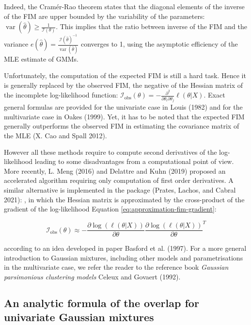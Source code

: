 Indeed, the Cramér-Rao theorem states that the diagonal elements of the
inverse of the FIM are upper bounded by the variability of the
parameters:
\(\operatorname{var}(\hat{\theta}) \ge \frac{1}{\mathcal{I}(\theta)}\). This
implies that the ratio between inverse of the FIM and the variance
\(e(\hat{\theta})=\frac{\mathcal{I}(\hat{\theta})^{-1}}{\operatorname{var}(\hat{\theta})}\)
converges to 1, using the asymptotic efficiency of the MLE estimate of
GMMs.

Unfortunately, the computation of the expected FIM is still a hard task.
Hence it is generally replaced by the observed FIM, the negative of the
Hessian matrix of the incomplete log-likelihood function:
\(\mathcal{I}_\text{obs}(\theta)= -\frac{\partial^2}{\partial \theta_i \partial \theta_j} \ell(\theta|X)\).
Exact general formulas are provided for the univariate case in Louis (1982)
and for the multivariate case in Oakes (1999). Yet, it has to be noted that
the expected FIM generally outperforms the observed FIM in estimating
the covariance matrix of the MLE (X. Cao and Spall 2012).

However all these methods require to compute second derivatives of the
log-likelihood leading to some disadvantages from a computational point
of view. More recently, L. Meng (2016) and Delattre and Kuhn (2019) proposed an
accelerated algorithm requiring only computation of first order
derivatives. A similar alternative is implemented in the
 package (Prates, Lachos, and Cabral 2021):
, in which the Hessian matrix is approximated by the cross-product of the
gradient of the log-likelihood Equation
\eqref{eq:approximation-fim-gradient}:

\begin{equation}
        \mathcal{I}_{\text{obs}}(\theta) \approx - \frac{\partial \log (\ell (\theta|X))}{\partial \theta} \frac{\partial \log (\ell (\theta|X))}{\partial \theta}^T
    \label{eq:approximation-fim-gradient}
\end{equation}

according to an idea developed in paper Basford et al. (1997). For a more general introduction to Gaussian mixtures, including other models and parametrisations in the multivariate case, we refer the reader to the reference book \emph{Gaussian parsimonious clustering models}
Celeux and Govaert (1992).

\hypertarget{an-analytic-formula-of-the-overlap-for-univariate-gaussian-mixtures}{%
\subsection{An analytic formula of the overlap for univariate Gaussian mixtures}\label{an-analytic-formula-of-the-overlap-for-univariate-gaussian-mixtures}}


